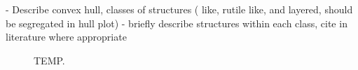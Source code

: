 - Describe convex hull, classes of structures ( like, rutile like, and layered, should be segregated in hull plot)
- briefly describe structures within each class, cite in literature where appropriate


\begin{figure}
\centering
{}
\caption{\label{fig:convergence_plot_iro3_0}
TEMP.
}
\end{figure}
